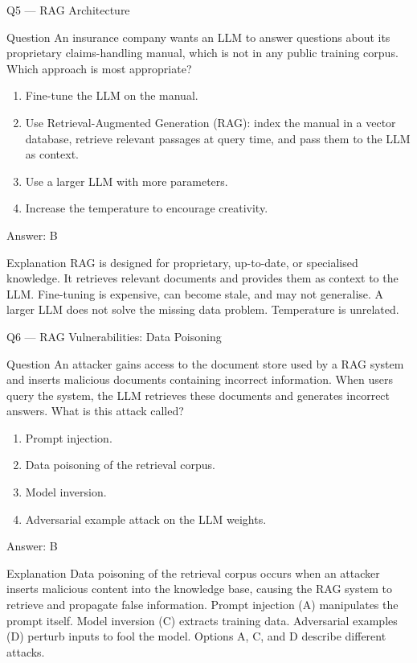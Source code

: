 \documentclass[aspectratio=169,8pt]{beamer}
\begin{document}
	\begin{frame}{Q5 --- RAG Architecture}
		\begin{block}{Question}
			An insurance company wants an LLM to answer questions about its proprietary claims-handling manual, which is not in any public training corpus. Which approach is most appropriate?
			\begin{enumerate}
				\item Fine-tune the LLM on the manual.
				\item Use Retrieval-Augmented Generation (RAG): index the manual in a vector database, retrieve relevant passages at query time, and pass them to the LLM as context.
				\item Use a larger LLM with more parameters.
				\item Increase the temperature to encourage creativity.
			\end{enumerate}
		\end{block}
		\begin{exampleblock}{Answer: B}\end{exampleblock}
		\begin{block}{Explanation}
			RAG is designed for proprietary, up-to-date, or specialised knowledge. It retrieves relevant documents and provides them as context to the LLM. Fine-tuning is expensive, can become stale, and may not generalise. A larger LLM does not solve the missing data problem. Temperature is unrelated.
		\end{block}
	\end{frame}
	
	\begin{frame}{Q6 --- RAG Vulnerabilities: Data Poisoning}
		\begin{block}{Question}
			An attacker gains access to the document store used by a RAG system and inserts malicious documents containing incorrect information. When users query the system, the LLM retrieves these documents and generates incorrect answers. What is this attack called?
			\begin{enumerate}
				\item Prompt injection.
				\item Data poisoning of the retrieval corpus.
				\item Model inversion.
				\item Adversarial example attack on the LLM weights.
			\end{enumerate}
		\end{block}
		\begin{exampleblock}{Answer: B}\end{exampleblock}
		\begin{block}{Explanation}
			Data poisoning of the retrieval corpus occurs when an attacker inserts malicious content into the knowledge base, causing the RAG system to retrieve and propagate false information. Prompt injection (A) manipulates the prompt itself. Model inversion (C) extracts training data. Adversarial examples (D) perturb inputs to fool the model. Options A, C, and D describe different attacks.
		\end{block}
	\end{frame}
	
\end{document}
